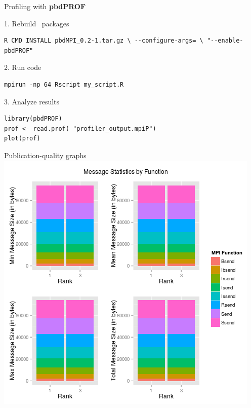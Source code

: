 \begin{frame}[fragile]
  \begin{block}{Profiling with \textbf{pbdPROF}}
  \begin{minipage}[t]{.58\textwidth}
  \vspace{0pt}
  1. Rebuild \pbdR\ packages
\vspace*{-.5cm}
\begin{lstlisting}[language=shl,title=\ ]
R CMD INSTALL pbdMPI_0.2-1.tar.gz \ --configure-args= \ "--enable-pbdPROF"
\end{lstlisting}
2. Run code
\vspace*{-.5cm}
\begin{lstlisting}[language=shl,title=\ ]
mpirun -np 64 Rscript my_script.R
\end{lstlisting}

3. Analyze results
\vspace{-.5cm}
\begin{lstlisting}[title=\ ]
library(pbdPROF)
prof <- read.prof( "profiler_output.mpiP")
plot(prof)
\end{lstlisting}
  \end{minipage}
  \hfill
  \begin{minipage}[t]{.4\textwidth}
  \vspace{0pt}
    \centering
    Publication-quality graphs\\
    \includegraphics[scale=.25]{../common/pics/mpip}

\end{minipage}
\end{block}
\end{frame}
